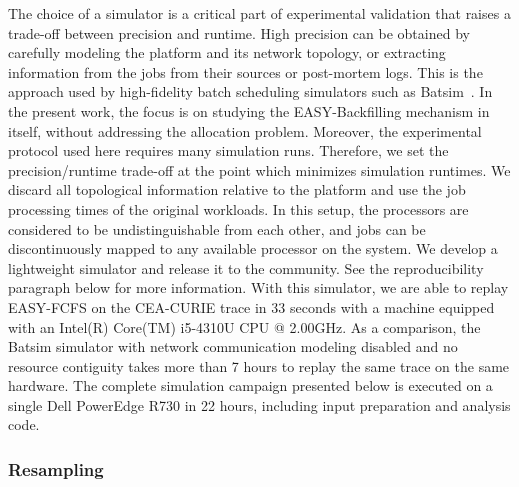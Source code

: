 \documentclass[sigconf,anonymous]{acmart}
\begin{document}
The choice of a simulator is a critical part of experimental validation that
raises a trade-off between precision and runtime. High precision can be obtained
by carefully modeling the platform and its network topology, or extracting
information from the jobs from their sources or post-mortem logs. This is the
approach used by high-fidelity batch scheduling simulators such as
Batsim~\cite{batsim}. In the present work, the focus is on studying the
EASY-Backfilling mechanism in itself, without addressing the allocation problem.
Moreover, the experimental protocol used here requires many simulation runs.
Therefore, we set the precision/runtime trade-off at the point which minimizes
simulation runtimes. We discard all topological information relative to the
platform and use the job processing times of the original workloads. In this
setup, the processors are considered to be undistinguishable from each other,
and jobs can be discontinuously mapped to any available processor on the
system. We develop a lightweight simulator\cite{ocst} and release it to the
community. See the reproducibility paragraph below for more information.  With
this simulator, we are able to replay EASY-FCFS on the CEA-CURIE trace in 33
seconds with a machine equipped with an Intel(R) Core(TM) i5-4310U CPU @
2.00GHz. As a comparison, the Batsim simulator with network
communication modeling disabled and no resource contiguity takes more than 7 hours to
replay the same trace on the same hardware. The complete simulation campaign
presented below is executed on a single Dell PowerEdge R730 in 22 hours,
including input preparation and analysis code.

\subsubsection{Resampling}
\label{ssub:resampling}
\end{document}
